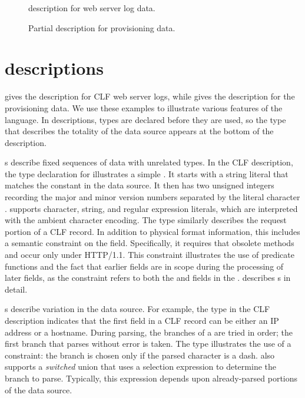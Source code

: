 \begin{figure}
\caption{\pads{} description for web server log data.}
\label{figure:wsl}
\end{figure}

\begin{figure}
\caption{Partial \pads{} description for \dibbler{} provisioning data.}
\label{figure:dibbler}
\end{figure}



\section{\padsl{} descriptions}
\label{sec:example:padsl-description}
 gives the \pads{} description for CLF web server
logs,  while  gives the description for the
\dibbler{} provisioning data.  We use these examples to illustrate
various features of the \pads{} language.  In \pads{} descriptions,
types are declared before they are used, so the type that describes
the totality of the data source appears at the bottom of the
description.

s describe fixed sequences of data with unrelated types.
In the CLF description, the type declaration for 
illustrates a simple . It starts with a string literal
that matches the constant  in the data source.  It then has
two unsigned integers recording the major and minor version numbers
separated by the literal character .  \pads{} supports
character, string, and regular expression literals, which are
interpreted with the ambient character encoding. The type
 similarly describes the request portion of a CLF
record.  In addition to physical format information, this 
includes a semantic constraint on the  field.
Specifically, it requires that obsolete methods  and
 occur only under HTTP/1.1.  This constraint illustrates
the use of predicate functions and the fact that earlier fields are in
scope during the processing of later fields, as the constraint refers
to both the  and  fields in the .
 describes s in detail.

s describe variation in the data source.  For example, the
 type in the CLF description indicates that the first
field in a CLF record can be either an IP address or a hostname.
During parsing, the branches of a  are tried in order; the
first branch that parses without error is taken.  The 
type illustrates the use of a constraint: the branch 
is chosen only if the parsed character is a dash.  \pads{} also
supports a \textit{switched} union that uses a selection expression to
determine the branch to parse.  Typically, this expression depends
upon already-parsed portions of the data source.

